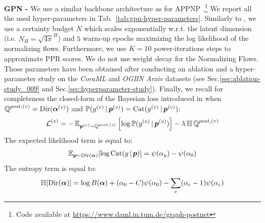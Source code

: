 \textbf{GPN - } We use a similar backbone architecture as for APPNP \citep{Klicpera2018}.\footnote{Code available at \url{https://www.daml.in.tum.de/graph-postnet}} We report all the used hyper-parameters in Tab.~\ref{tab:gpn-hyper-parameters}. Similarly to \citep{NatPN2021}, we use a certainty budget $N$ which scales exponentially w.r.t. the latent dimension (i.e. $N_H=\sqrt{4 \pi}^H$) and $5$ warm-up epochs maximizing the log likelihood of the normalizing flows. Furthermore, we use $K=10$ power-iterations steps to approximate PPR scores. We do not use weight decay for the Normalizing Flows. Those parameters have been obtained after conducting an ablation and a hyper-parameter study on the \emph{CoraML} and \emph{OGBN Arxiv} datasets (see Sec.\ref{sec:ablation-study_009} and Sec.\ref{sec:hyperparameter-study}). Finally, we recall for completeness the closed-form of the Bayesian loss introduced in \citep{charpentier2020} when $\operatorname{\mathbb{Q}}^{post, (v)}=\operatorname{Dir}(\bm{\alpha}^{(v)})$ and $\mathbb{P}(y^{(v)} \,|\, \bm{p}^{(v)}) = \operatorname{Cat}(y^{(v)} \,|\, \bm{p}^{(v)})$:
\begin{equation}
    \operatorname{\mathcal{L}}^{(v)} = -\operatorname{\mathbb{E}}_{\bm{p}^{(v)}\sim \operatorname{\mathbb{Q}}^{post, (v)}}\left[\log \mathbb{P}(y^{(v)} \,|\, \bm{p}^{(v)})\right] - \lambda \operatorname{\mathbb{H}}{\operatorname{\mathbb{Q}}^{post, (v)}}
\end{equation}
The expected likelihood term is equal to:
\begin{align}\label{eq:expected-likelihood-cat-dir_009}
    \operatorname{\mathbb{E}}_{\bm{p} \sim \operatorname{Dir}(\bm{\alpha})}[\log \operatorname{Cat}(y \,|\, \bm{p})] = \psi(\alpha_{y}) - \psi(\alpha_0)
\end{align}
The entropy term is equal to:
\begin{align}\label{eq:density-entropy-dirichlet_009}
        \operatorname{\mathbb{H}}[\operatorname{Dir}(\bm{\alpha})] = \log B(\bm{\alpha}) + (\alpha_0 - C) \psi(\alpha_0) - \sum_c (\alpha_c - 1) \psi(\alpha_c)
\end{align}



